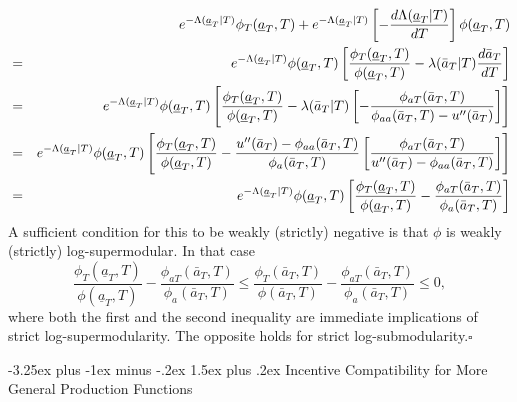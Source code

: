 \documentclass[12pt]{article}
\makeatletter
\renewcommand{\subsection}{%
  \@startsection{subsection}{2}{\z@}%
  {-3.25ex plus -1ex minus -.2ex}%
  {1.5ex plus .2ex}%
  {\normalfont\large\bfseries}%
}
\makeatother
\begin{document}
\begin{eqnarray*}
&&e^{-\Lambda (\underline{a}_{T}|T)}\phi _{T}(\underline{a}%
_{T},T)+e^{-\Lambda (\underline{a}_{T}|T)}\left[ -\frac{d\Lambda (\underline{%
a}_{T}|T)}{dT}\right] \phi (\underline{a}_{T},T) \\
&=&e^{-\Lambda (\underline{a}_{T}|T)}\phi (\underline{a}_{T},T)\left[ \frac{%
\phi _{T}(\underline{a}_{T},T)}{\phi (\underline{a}_{T},T)}-\lambda (\bar{a}%
_{T}|T)\frac{d\bar{a}_{T}}{dT}\right] \\
&=&e^{-\Lambda (\underline{a}_{T}|T)}\phi (\underline{a}_{T},T)\left[ \frac{%
\phi _{T}(\underline{a}_{T},T)}{\phi (\underline{a}_{T},T)}-\lambda (\bar{a}%
_{T}|T)\left[ -\frac{\phi _{aT}(\bar{a}_{T},T)}{\phi _{aa}(\bar{a}%
_{T},T)-u^{\prime \prime }(\bar{a}_{T})}\right] \right] \\
&=&e^{-\Lambda (\underline{a}_{T}|T)}\phi (\underline{a}_{T},T)\left[ \frac{%
\phi _{T}(\underline{a}_{T},T)}{\phi (\underline{a}_{T},T)}-\frac{u^{\prime
\prime }(\bar{a}_{T})-\phi _{aa}(\bar{a}_{T},T)}{\phi _{a}(\bar{a}_{T},T)}%
\left[ \frac{\phi _{aT}(\bar{a}_{T},T)}{ u^{\prime \prime }(\bar{a}_{T}) - \phi _{aa}(\bar{a}%
_{T},T)}\right] \right] \\
&=&e^{-\Lambda (\underline{a}_{T}|T)}\phi (\underline{a}_{T},T)\left[ \frac{%
\phi _{T}(\underline{a}_{T},T)}{\phi (\underline{a}_{T},T)}-\frac{\phi _{aT}(%
\bar{a}_{T},T)}{\phi _{a}(\bar{a}_{T},T)}\right]
\end{eqnarray*}%
A sufficient condition for this to be weakly (strictly) negative is that $\phi $ is
weakly (strictly) log-supermodular. In that case 
\begin{equation*}
\frac{\phi _{T}(\underline{a}_{T},T)}{\phi (\underline{a}_{T},T)}-\frac{\phi
_{aT}(\bar{a}_{T},T)}{\phi _{a}(\bar{a}_{T},T)} \leq \frac{\phi _{T}(\bar{a}%
_{T},T)}{\phi (\bar{a}_{T},T)}-\frac{\phi _{aT}(\bar{a}_{T},T)}{\phi _{a}(%
\bar{a}_{T},T)} \leq 0,
\end{equation*}%
where both the first and the second inequality are immediate implications of
strict log-supermodularity. The opposite holds for strict log-submodularity.$%
\square $


\bigskip


\subsection{Incentive Compatibility for More General Production Functions}
\label{online_app:ic_general_prod}
\end{document}
